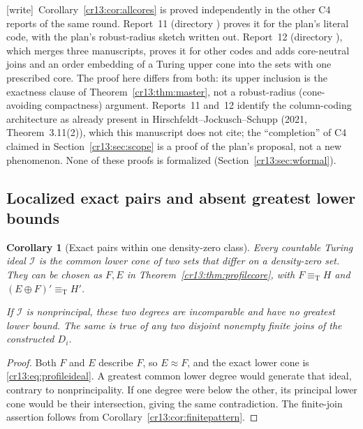 \documentclass[11pt,letterpaper]{article}
\newtheorem{corollary}[theorem]{Corollary}
\theoremstyle{definition}
\theoremstyle{remark}\newtheorem{remark}[theorem]{Remark}
\numberwithin{equation}{section}
\newcommand{\eqT}{\equiv_{\mathrm T}}
\newcommand{\Ideal}{\mathcal I}
\newcommand{\wtag}{\textup{[write]}}
\begin{document}
\noindent\wtag\ Corollary~\ref{cr13:cor:allcores} is proved independently in the other C4 reports of the same round. Report~11 (directory ) proves it for the plan's literal code, with the plan's robust-radius sketch written out. Report~12 (directory ), which merges three manuscripts, proves it for other codes and adds core-neutral joins and an order embedding of a Turing upper cone into the sets with one prescribed core. The proof here differs from both: its upper inclusion is the exactness clause of Theorem~\ref{cr13:thm:master}, not a robust-radius (cone-avoiding compactness) argument. Reports~11 and~12 identify the column-coding architecture as already present in Hirschfeldt--Jockusch--Schupp (2021, Theorem~3.11(2)), which this manuscript does not cite; the ``completion'' of C4 claimed in Section~\ref{cr13:sec:scope} is a proof of the plan's proposal, not a new phenomenon. None of these proofs is formalized (Section~\ref{cr13:sec:wformal}).

\subsection{Localized exact pairs and absent greatest lower bounds}
\begin{corollary}[Exact pairs within one density-zero class]\label{cr13:cor:localexact}
Every countable Turing ideal $\Ideal$ is the common lower cone of two sets that differ on a density-zero set. They can be chosen as $F,E$ in Theorem~\ref{cr13:thm:profilecore}, with $F\eqT H$ and $(E\oplus F)'\eqT H'$.

If $\Ideal$ is nonprincipal, these two degrees are incomparable and have no greatest lower bound. The same is true of any two disjoint nonempty finite joins of the constructed $D_i$.
\end{corollary}
\begin{proof}
Both $F$ and $E$ describe $F$, so $E\approx F$, and the exact lower cone is \eqref{cr13:eq:profileideal}. A greatest common lower degree would generate that ideal, contrary to nonprincipality. If one degree were below the other, its principal lower cone would be their intersection, giving the same contradiction. The finite-join assertion follows from Corollary~\ref{cr13:cor:finitepattern}.
\end{proof}
\end{document}
